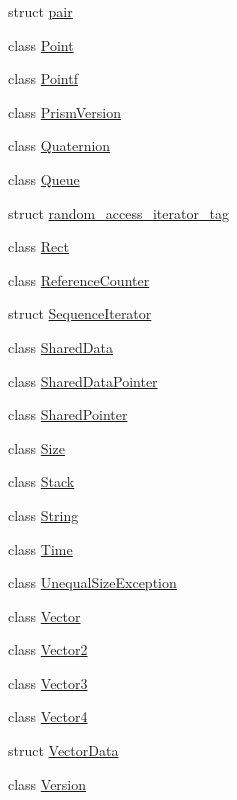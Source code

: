 \begin{DoxyCompactItemize}
struct \hyperlink{structprism_1_1pair}{pair}
\item 
class \hyperlink{classprism_1_1_point}{Point}
\item 
class \hyperlink{classprism_1_1_pointf}{Pointf}
\item 
class \hyperlink{classprism_1_1_prism_version}{Prism\+Version}
\item 
class \hyperlink{classprism_1_1_quaternion}{Quaternion}
\item 
class \hyperlink{classprism_1_1_queue}{Queue}
\item 
struct \hyperlink{structprism_1_1random__access__iterator__tag}{random\+\_\+access\+\_\+iterator\+\_\+tag}
\item 
class \hyperlink{classprism_1_1_rect}{Rect}
\item 
class \hyperlink{classprism_1_1_reference_counter}{Reference\+Counter}
\item 
struct \hyperlink{structprism_1_1_sequence_iterator}{Sequence\+Iterator}
\item 
class \hyperlink{classprism_1_1_shared_data}{Shared\+Data}
\item 
class \hyperlink{classprism_1_1_shared_data_pointer}{Shared\+Data\+Pointer}
\item 
class \hyperlink{classprism_1_1_shared_pointer}{Shared\+Pointer}
\item 
class \hyperlink{classprism_1_1_size}{Size}
\item 
class \hyperlink{classprism_1_1_stack}{Stack}
\item 
class \hyperlink{classprism_1_1_string}{String}
\item 
class \hyperlink{classprism_1_1_time}{Time}
\item 
class \hyperlink{classprism_1_1_unequal_size_exception}{Unequal\+Size\+Exception}
\item 
class \hyperlink{classprism_1_1_vector}{Vector}
\item 
class \hyperlink{classprism_1_1_vector2}{Vector2}
\item 
class \hyperlink{classprism_1_1_vector3}{Vector3}
\item 
class \hyperlink{classprism_1_1_vector4}{Vector4}
\item 
struct \hyperlink{structprism_1_1_vector_data}{Vector\+Data}
\item 
class \hyperlink{classprism_1_1_version}{Version}
\end{DoxyCompactItemize}
